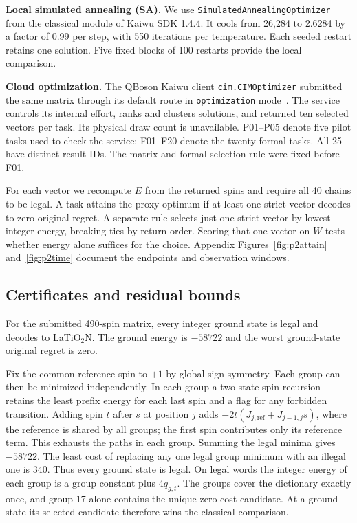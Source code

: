 \textbf{Local simulated annealing (SA).} We use \texttt{Simulated\allowbreak Annealing\allowbreak Optimizer} from the classical module of Kaiwu SDK 1.4.4. It cools from 26,284 to 2.6284 by a factor of 0.99 per step, with 550 iterations per temperature. Each seeded restart retains one solution. Five fixed blocks of 100 restarts provide the local comparison.

\textbf{Cloud optimization.} The QBoson Kaiwu client \texttt{cim.CIMOptimizer} submitted the same matrix through its default route in \texttt{optimization} mode~\cite{kaiwu144}. The service controls its internal effort, ranks and clusters solutions, and returned ten selected vectors per task. Its physical draw count is unavailable. P01--P05 denote five pilot tasks used to check the service; F01--F20 denote the twenty formal tasks. All 25 have distinct result IDs. The matrix and formal selection rule were fixed before F01.

For each vector we recompute $E$ from the returned spins and require all 40 chains to be legal. A task attains the proxy optimum if at least one strict vector decodes to zero original regret. A separate rule selects just one strict vector by lowest integer energy, breaking ties by return order. Scoring that one vector on $W$ tests whether energy alone suffices for the choice. Appendix Figures~\ref{fig:p2attain} and~\ref{fig:p2time} document the endpoints and observation windows.

\subsection{Certificates and residual bounds}\label{sec:p2cert}
\begin{proposition}\label{prop:p2ground}
For the submitted 490-spin matrix, every integer ground state is legal and decodes to LaTiO$_2$N. The ground energy is $-58722$ and the worst ground-state original regret is zero.
\end{proposition}
\begin{p1proof}
Fix the common reference spin to $+1$ by global sign symmetry. Each group can then be minimized independently. In each group a two-state spin recursion retains the least prefix energy for each last spin and a flag for any forbidden transition. Adding spin $t$ after $s$ at position $j$ adds $-2t(J_{j,\mathrm{ref}}+J_{j-1,j}s)$, where the reference is shared by all groups; the first spin contributes only its reference term. This exhausts the paths in each group. Summing the legal minima gives $-58722$. The least cost of replacing any one legal group minimum with an illegal one is 340. Thus every ground state is legal. On legal words the integer energy of each group is a group constant plus $4q_{g,t}$. The groups cover the dictionary exactly once, and group 17 alone contains the unique zero-cost candidate. At a ground state its selected candidate therefore wins the classical comparison.
\end{p1proof}

